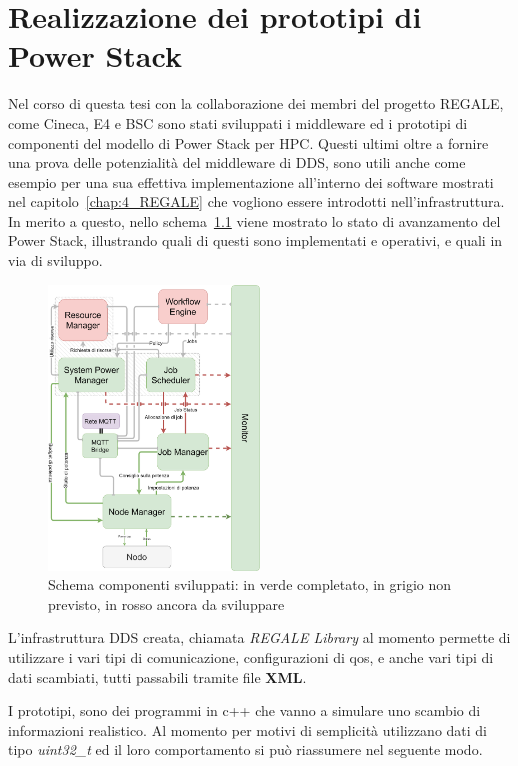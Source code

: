 \chapter{Realizzazione dei prototipi di Power Stack}
Nel corso di questa tesi con la collaborazione dei membri del progetto REGALE, come Cineca\cite{Cineca}, E4\cite{E4} e BSC\cite{BSC} sono stati sviluppati i middleware ed i prototipi di componenti del modello di Power Stack per HPC.
Questi ultimi oltre a fornire una prova delle potenzialità del middleware di DDS, sono utili anche come esempio per una sua effettiva implementazione all'interno dei software mostrati nel capitolo~\ref{chap:4_REGALE} che vogliono essere introdotti nell'infrastruttura.
In merito a questo, nello schema~\ref{fig:schema_global_dummy_implementati} viene mostrato lo stato di avanzamento del Power Stack, illustrando quali di questi sono implementati e operativi, e quali in via di sviluppo.

\begin{figure}[H]
    \centering
    \includegraphics[width=0.5\textwidth]{./img/SchemaPowerStack_perdummy.drawio.png} %
    \caption{Schema componenti sviluppati: in verde completato, in grigio non previsto, in rosso ancora da sviluppare}
    \label{fig:schema_global_dummy_implementati}
\end{figure}
L'infrastruttura DDS creata, chiamata \emph{REGALE Library}\cite{TODO} al momento permette di utilizzare i vari tipi di comunicazione, configurazioni di qos, e anche vari tipi di dati scambiati, tutti passabili tramite file \textbf{XML}.

I prototipi, sono dei programmi in c++ che vanno a simulare uno scambio di informazioni realistico. Al momento per motivi di semplicità utilizzano dati di tipo \emph{uint32\_t} ed il loro comportamento si può riassumere nel seguente modo.

